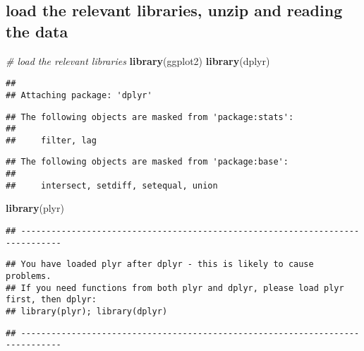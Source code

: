 \documentclass[
]{article}
\newenvironment{Shaded}{\begin{snugshade}}{\end{snugshade}}
\newcommand{\CommentTok}[1]{\textcolor[rgb]{0.56,0.35,0.01}{\textit{#1}}}
\newcommand{\KeywordTok}[1]{\textcolor[rgb]{0.13,0.29,0.53}{\textbf{#1}}}
\newcommand{\NormalTok}[1]{#1}
\begin{document}
\hypertarget{load-the-relevant-libraries-unzip-and-reading-the-data}{%
\subsection{load the relevant libraries, unzip and reading the
data}\label{load-the-relevant-libraries-unzip-and-reading-the-data}}

\begin{Shaded}
\begin{Highlighting}[]
\CommentTok{# load the relevant libraries}
\KeywordTok{library}\NormalTok{(ggplot2)}
\KeywordTok{library}\NormalTok{(dplyr)}
\end{Highlighting}
\end{Shaded}

\begin{verbatim}
## 
## Attaching package: 'dplyr'
\end{verbatim}

\begin{verbatim}
## The following objects are masked from 'package:stats':
## 
##     filter, lag
\end{verbatim}

\begin{verbatim}
## The following objects are masked from 'package:base':
## 
##     intersect, setdiff, setequal, union
\end{verbatim}

\begin{Shaded}
\begin{Highlighting}[]
\KeywordTok{library}\NormalTok{(plyr)}
\end{Highlighting}
\end{Shaded}

\begin{verbatim}
## ------------------------------------------------------------------------------
\end{verbatim}

\begin{verbatim}
## You have loaded plyr after dplyr - this is likely to cause problems.
## If you need functions from both plyr and dplyr, please load plyr first, then dplyr:
## library(plyr); library(dplyr)
\end{verbatim}

\begin{verbatim}
## ------------------------------------------------------------------------------
\end{verbatim}
\end{document}
